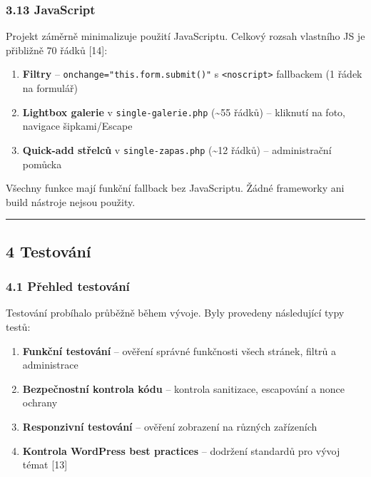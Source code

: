 \subsubsection{3.13 JavaScript}\label{javascript}

Projekt záměrně minimalizuje použití JavaScriptu. Celkový rozsah
vlastního JS je přibližně 70 řádků {[}14{]}:

\begin{enumerate}
\def\labelenumi{\arabic{enumi}.}
\tightlist
\item
  \textbf{Filtry} -- \texttt{onchange="this.form.submit()"} s
  \texttt{\textless{}noscript\textgreater{}} fallbackem (1 řádek na
  formulář)
\item
  \textbf{Lightbox galerie} v \texttt{single-galerie.php}
  (\textasciitilde55 řádků) -- kliknutí na foto, navigace šipkami/Escape
\item
  \textbf{Quick-add střelců} v \texttt{single-zapas.php}
  (\textasciitilde12 řádků) -- administrační pomůcka
\end{enumerate}

Všechny funkce mají funkční fallback bez JavaScriptu. Žádné frameworky
ani build nástroje nejsou použity.

\begin{center}\rule{0.5\linewidth}{0.5pt}\end{center}

\subsection{4 Testování}\label{testovuxe1nuxed}

\subsubsection{4.1 Přehled testování}\label{pux159ehled-testovuxe1nuxed}

Testování probíhalo průběžně během vývoje. Byly provedeny následující
typy testů:

\begin{enumerate}
\def\labelenumi{\arabic{enumi}.}
\tightlist
\item
  \textbf{Funkční testování} -- ověření správné funkčnosti všech
  stránek, filtrů a administrace
\item
  \textbf{Bezpečnostní kontrola kódu} -- kontrola sanitizace, escapování
  a nonce ochrany
\item
  \textbf{Responzivní testování} -- ověření zobrazení na různých
  zařízeních
\item
  \textbf{Kontrola WordPress best practices} -- dodržení standardů pro
  vývoj témat {[}13{]}
\end{enumerate}

